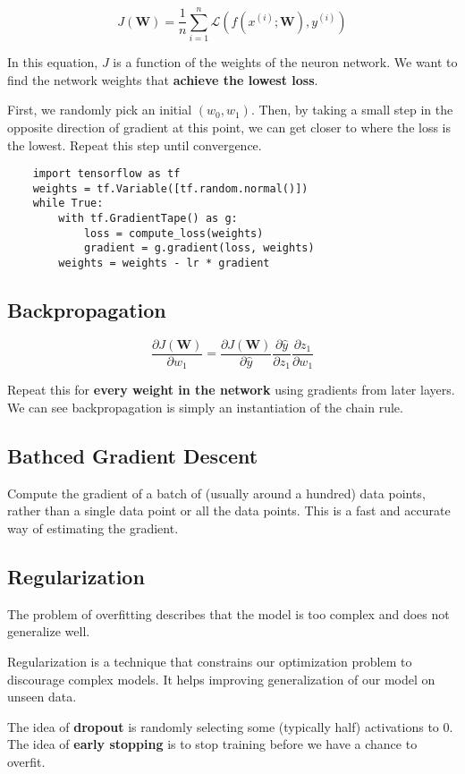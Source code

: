 \documentclass[12pt, a4paper, oneside]{article}
\begin{document}
\begin{equation}
    J(\bm{W})=\frac{1}{n}\sum_{i=1}^{n}\mathcal{L}(f(x^{(i)};\bm{W}),y^{(i)})
\end{equation}

In this equation, $J$ is a function of the weights of the neuron network. We want to find the network weights that \textbf{achieve the lowest loss}. 

First, we randomly pick an initial $(w_{0},w_{1})$. Then, by taking a small step in the opposite direction of gradient at this point, we can get closer to where the loss is the lowest. Repeat this step until convergence.

\begin{lstlisting}
    import tensorflow as tf
    weights = tf.Variable([tf.random.normal()])
    while True:
        with tf.GradientTape() as g:
            loss = compute_loss(weights)
            gradient = g.gradient(loss, weights)
        weights = weights - lr * gradient
\end{lstlisting}

\subsection{Backpropagation}

\begin{equation}
    \frac{\partial J(\bm{W})}{\partial w_{1}}=\frac{\partial J(\bm{W})}{\partial \hat{y}}\frac{\partial\hat{y}}{\partial z_{1}}\frac{\partial z_{1}}{\partial w_{1}}
\end{equation}

Repeat this for \textbf{every weight in the network} using gradients from later layers. We can see backpropagation is simply an instantiation of the chain rule.

\subsection{Bathced Gradient Descent}

Compute the gradient of a batch of (usually around a hundred) data points, rather than a single data point or all the data points. This is a fast and accurate way of estimating the gradient.

\subsection{Regularization}

The problem of overfitting describes that the model is too complex and does not generalize well.

Regularization is a technique that constrains our optimization problem to discourage complex models. It helps improving generalization of our model on unseen data.

The idea of \textbf{dropout} is randomly selecting some (typically half) activations to $0$. The idea of \textbf{early stopping} is to stop training before we have a chance to overfit.
\end{document}
